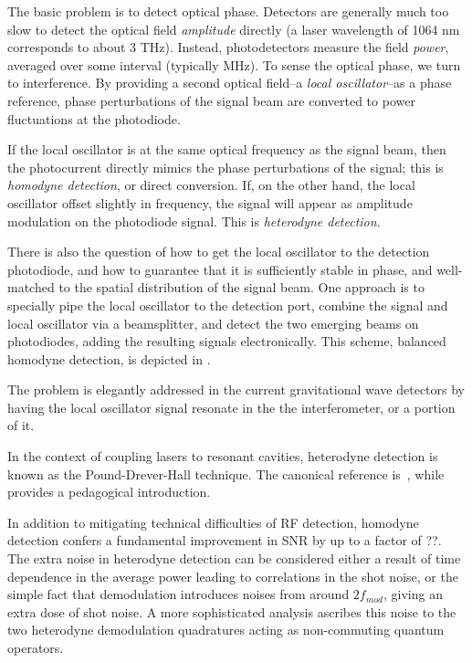 \label{chapter3}
\doublespace
{}

The basic problem is to detect optical phase.  Detectors are generally
much too slow to detect the optical field \emph{amplitude} directly (a
laser wavelength of 1064 nm corresponds to about 3 THz).  Instead,
photodetectors measure the field \emph{power}, averaged over some
interval (typically MHz).  To sense the optical phase, we turn to
interference.  By providing a second optical field--a \emph{local
  oscillator}--as a phase reference, phase perturbations of the signal
beam are converted to power fluctuations at the photodiode.  

If the local oscillator is at the same optical frequency as the signal
beam, then the photocurrent directly mimics the phase perturbations of
the signal; this is \emph{homodyne detection}, or direct conversion.
If, on the other hand, the local oscillator offset slightly in
frequency, the signal will appear as amplitude modulation on the
photodiode signal.  This is \emph{heterodyne detection}.

There is also the question of how to get the local oscillator to the
detection photodiode, and how to guarantee that it is sufficiently
stable in phase, and well-matched to the spatial distribution of the
signal beam.  One approach is to specially pipe the local oscillator
to the detection port, combine the signal and local oscillator via a
beamsplitter, and detect the two emerging beams on photodiodes, adding
the resulting signals electronically.  This scheme, balanced homodyne
detection, is depicted in .

The problem is elegantly addressed in the current gravitational wave
detectors by having the local oscillator signal resonate in the the
interferometer, or a portion of it.


In the context of coupling lasers to resonant cavities, heterodyne
detection is known as the Pound-Drever-Hall technique.  The canonical
reference is~\cite{Drever1983Laser}, while \cite{Black2001Introduction} provides a pedagogical introduction.



In addition to mitigating technical difficulties of RF detection,
homodyne detection confers a fundamental improvement in SNR by up to a
factor of ??. The extra noise in heterodyne detection can be
considered either a result of time dependence in the average power
leading to correlations in the shot
noise\cite{Niebauer1991Nonstationary}, or the simple fact that
demodulation introduces noises from around $2f_{mod}$, giving
an extra dose of shot noise.  A more sophisticated analysis ascribes
this noise to the two heterodyne demodulation quadratures acting as
non-commuting quantum operators\cite{Buonanno2003Quantum}.
